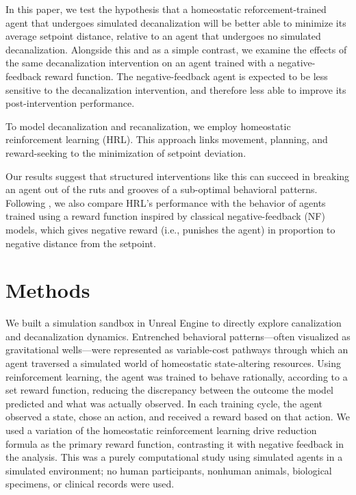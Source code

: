 \documentclass[12pt,fleqn]{article}
\begin{document}
In this paper, we test the hypothesis that a homeostatic reforcement-trained agent that undergoes simulated decanalization will be better able to minimize its average setpoint distance, relative to an agent that undergoes no simulated decanalization. Alongside this and as a simple contrast, we examine the effects of the same decanalization intervention on an agent trained with a negative-feedback reward function. The negative-feedback agent is expected to be less sensitive to the decanalization intervention, and therefore less able to improve its post-intervention performance.

To model decanalization and recanalization, we employ homeostatic reinforcement learning (HRL). This approach links movement, planning, and reward-seeking to the minimization of setpoint deviation. 

Our results suggest that structured interventions like this can succeed in breaking an agent out of the ruts and grooves of a sub-optimal behavioral patterns. Following \cite{keramati_homeostatic_2014}, we also compare HRL's performance with the behavior of agents trained using a reward function inspired by classical negative-feedback (NF) models, which gives negative reward (i.e., punishes the agent) in proportion to negative distance from the setpoint.


\section{Methods}

We built a simulation sandbox in Unreal Engine to directly explore canalization and decanalization dynamics. Entrenched behavioral patterns—often visualized as gravitational wells—were represented as variable-cost pathways through which an agent traversed a simulated world of homeostatic state-altering resources. Using reinforcement learning, the agent was trained to behave rationally, according to a set reward function, reducing the discrepancy between the outcome the model predicted and what was actually observed. In each training cycle, the agent observed a state, chose an action, and received a reward based on that action. We used a variation of the homeostatic reinforcement learning drive reduction formula as the primary reward function, contrasting it with negative feedback in the analysis. This was a purely computational study using simulated agents in a simulated environment; no human participants, nonhuman animals, biological specimens, or clinical records were used.
\end{document}
